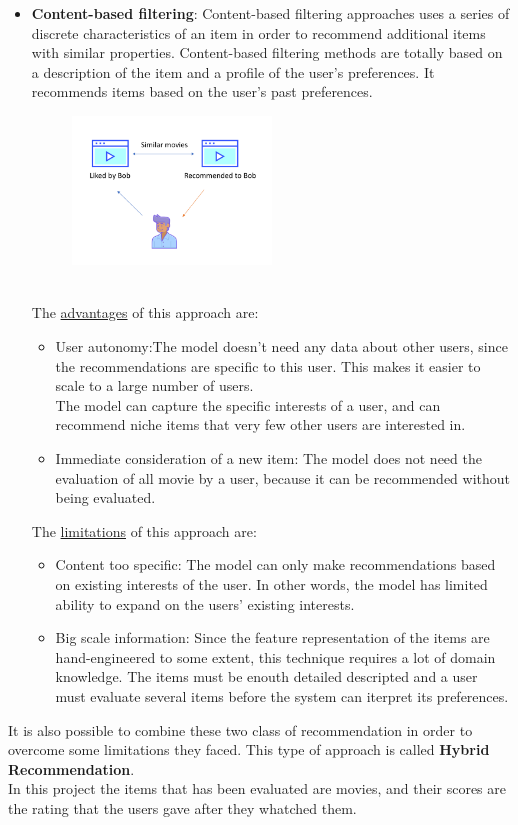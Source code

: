 \documentclass{article}
\begin{document}
\begin{itemize}
      \item \textbf{Content-based filtering}: Content-based filtering approaches uses a series of discrete characteristics of an item in order to recommend additional items with similar properties. Content-based filtering methods are totally based on a description of the item and a profile of the user’s preferences. It recommends items based on the user’s past preferences.\\
      \begin{figure}[ht]
            \begin{center}
                  \includegraphics[width=0.5\textwidth]{images/Content-based filtering.png}
            \end{center}
      \end{figure}\\
      The \underline{advantages} of this approach are:
      \begin{itemize}
            \item User autonomy:The model doesn't need any data about other users, since the recommendations are specific to this user. This makes it easier to scale to a large number of users.\\The model can capture the specific interests of a user, and can recommend niche items that very few other users are interested in.
            \item Immediate consideration of a new item: The model does not need the evaluation of all movie by a user, because it can be recommended without being evaluated.
      \end{itemize}
      The \underline{limitations} of this approach are:
      \begin{itemize}
            \item Content too specific: The model can only make recommendations based on existing interests of the user. In other words, the model has limited ability to expand on the users' existing interests.
            \item Big scale information: Since the feature representation of the items are hand-engineered to some extent, this technique requires a lot of domain knowledge. The items must be enouth detailed descripted and a user must evaluate several items before the system can iterpret its preferences.
      \end{itemize}
\end{itemize}
It is also possible to combine these two class of recommendation in order to overcome some limitations they faced. This type of approach is called \textbf{Hybrid Recommendation}.\\
In this project the items that has been evaluated are movies, and their scores are the rating that the users gave after they whatched them.
\end{document}
